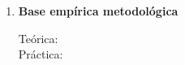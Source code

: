 \documentclass[10pt]{article}
\begin{document}
\begin{enumerate}

\vspace{0.1cm}
\item \textbf{Base empírica metodológica}
\vspace{-0.15cm}
\begin{description}
\item[Teórica:]
\item[Práctica:]
\end{description}

\end{enumerate}
% 
% 
\end{document}
